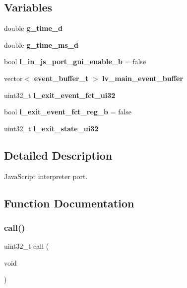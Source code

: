 \subsection*{Variables}
\begin{DoxyCompactItemize}
\item 
double \textbf{ g\+\_\+time\+\_\+d}
\item 
\mbox{\label{group___port_ga189cd3ebfbbd25c37e9dd8e9f7b3d3fd}} 
double {\bfseries g\+\_\+time\+\_\+ms\+\_\+d}
\item 
bool \textbf{ l\+\_\+in\+\_\+js\+\_\+port\+\_\+gui\+\_\+enable\+\_\+b} = false
\item 
\mbox{\label{group___port_ga24356c34737c91bb2e0f3d0a271f10ae}} 
vector$<$ \textbf{ event\+\_\+buffer\+\_\+t} $>$ {\bfseries lv\+\_\+main\+\_\+event\+\_\+buffer}
\item 
\mbox{\label{group___port_gaa29a12a818276cb4d43e6032ca8e29d5}} 
uint32\+\_\+t {\bfseries l\+\_\+exit\+\_\+event\+\_\+fct\+\_\+ui32}
\item 
\mbox{\label{group___port_ga02c37c39af21d427d709d8cd104e798a}} 
bool {\bfseries l\+\_\+exit\+\_\+event\+\_\+fct\+\_\+reg\+\_\+b} = false
\item 
\mbox{\label{group___port_ga22f54b7863fb8ecc5f92343b46c5903f}} 
uint32\+\_\+t {\bfseries l\+\_\+exit\+\_\+state\+\_\+ui32}
\end{DoxyCompactItemize}


\subsection{Detailed Description}
Java\+Script interpreter port. 



\subsection{Function Documentation}
\mbox{\label{group___port_gaab3618d6d3f311110e029970dc96afd3}} 
\subsubsection{call()}
{\footnotesize\ttfamily uint32\+\_\+t call (\begin{DoxyParamCaption}\item[{void}]{ }\end{DoxyParamCaption})\hspace{0.3cm}{\ttfamily [static]}}



